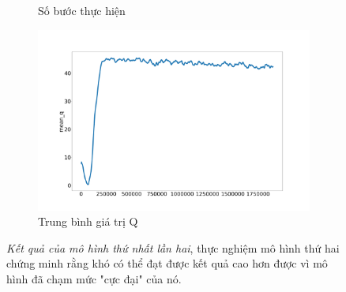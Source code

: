 \begin{figure}[ht]
\begin{subfigure}{.5\textwidth}
      \caption{Số bước thực hiện}
      \label{fig:first_model:try_2:step}
    \end{subfigure}%
    \begin{subfigure}{.5\textwidth}
      \includegraphics[width=1.1\textwidth]{Pic/First_model_50_reward/mean_q.png}
      \caption{Trung bình giá trị Q}
      \label{fig:first_model:try_2:mean_q}
    \end{subfigure}
\caption[Kết quả của mô hình thứ nhất lần hai]{\textit{Kết quả của mô hình thứ nhất lần hai}, thực nghiệm mô hình thứ hai chứng minh rằng khó có thể đạt được kết quả cao hơn được vì mô hình đã chạm mức "cực đại" của nó.}
\label{fig:result_first_model:try_2}
\end{figure}
\clearpage
